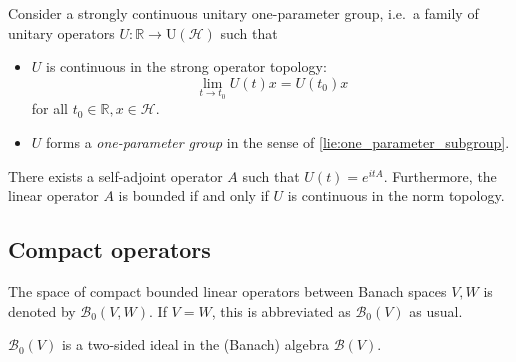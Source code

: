     \begin{theorem}[Stone]\label{functional:stone}
        Consider a strongly continuous unitary one-parameter group, i.e.~a family of unitary operators $U:\mathbb{R}\rightarrow\mathrm{U}(\mathcal{H})$ such that
        \begin{itemize}
            \item $U$ is continuous in the strong operator topology: \[\lim_{t\rightarrow t_0}U(t)x=U(t_0)x\] for all $t_0\in\mathbb{R}, x\in\mathcal{H}$.
            \item $U$ forms a \textit{one-parameter group} in the sense of \cref{lie:one_parameter_subgroup}.
        \end{itemize}
        There exists a self-adjoint operator $A$ such that $U(t)=e^{itA}$. Furthermore, the linear operator $A$ is bounded if and only if $U$ is continuous in the norm topology.
    \end{theorem}

\subsection{Compact operators}



    \begin{notation}
        The space of compact bounded linear operators between Banach spaces $V,W$ is denoted by $\mathcal{B}_0(V,W)$. If $V=W$, this is abbreviated as $\mathcal{B}_0(V)$ as usual.
    \end{notation}
    \begin{property}
        $\mathcal{B}_0(V)$ is a two-sided ideal in the (Banach) algebra $\mathcal{B}(V)$.
    \end{property}

